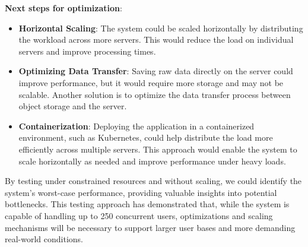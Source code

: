\textbf{Next steps for optimization}:
\begin{itemize}
    \item \textbf{Horizontal Scaling}: The system could be scaled horizontally by distributing the workload across more servers. This would reduce the load on individual servers and improve processing times.
    \item \textbf{Optimizing Data Transfer}: Saving raw data directly on the server could improve performance, but it would require more storage and may not be scalable. Another solution is to optimize the data transfer process between object storage and the server.
    \item \textbf{Containerization}: Deploying the application in a containerized environment, such as Kubernetes, could help distribute the load more efficiently across multiple servers. This approach would enable the system to scale horizontally as needed and improve performance under heavy loads.
\end{itemize}

By testing under constrained resources and without scaling, we could identify the system’s worst-case performance, providing valuable insights into potential bottlenecks. This testing approach has demonstrated that, while the system is capable of handling up to 250 concurrent users, optimizations and scaling mechanisms will be necessary to support larger user bases and more demanding real-world conditions.
